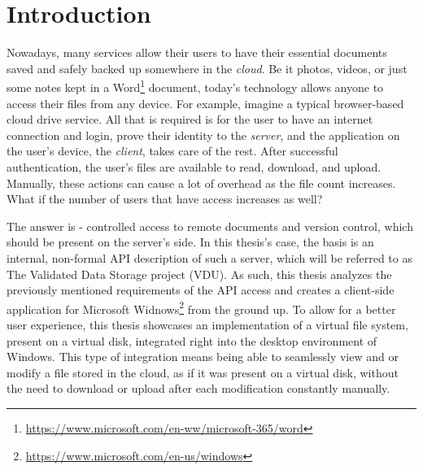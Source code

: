 
\chapter{Introduction}
\label{ch1}

Nowadays, many services allow their users to have their essential documents saved and safely backed up somewhere in the \textit{cloud}. Be it photos, videos, or just some notes kept in a Word\footnote{\url{https://www.microsoft.com/en-ww/microsoft-365/word}} document, today's technology allows anyone to access their files from any device. For example, imagine a typical browser-based cloud drive service. All that is required is for the user to have an internet connection and login, prove their identity to the \textit{server}, and the application on the user's device, the \textit{client}, takes care of the rest. After successful authentication, the user's files are available to read, download, and upload. Manually, these actions can cause a lot of overhead as the file count increases. What if the number of users that have access increases as well? 

The answer is - controlled access to remote documents and version control, which should be present on the server's side. In this thesis's case, the basis is an internal, non-formal API description of such a server, which will be referred to as The Validated Data Storage project (VDU). As such, this thesis analyzes the previously mentioned requirements of the API access and creates a client-side application for Microsoft Widnows\footnote{\url{https://www.microsoft.com/en-us/windows}} from the ground up. To allow for a better user experience, this thesis showcases an implementation of a virtual file system, present on a virtual disk, integrated right into the desktop environment of Windows. This type of integration means being able to seamlessly view and or modify a file stored in the cloud, as if it was present on a virtual disk, without the need to download or upload after each modification constantly manually. 

